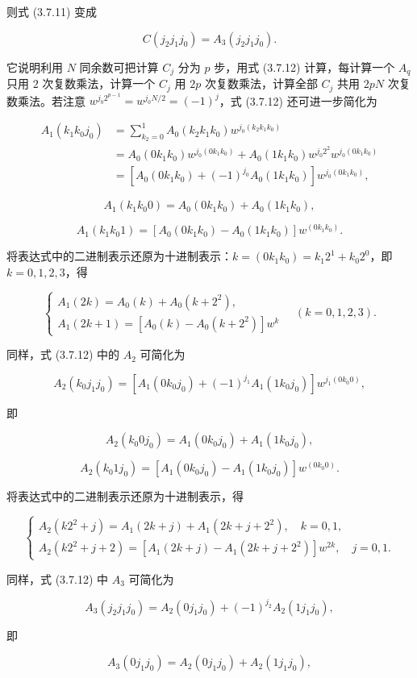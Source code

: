 \documentclass[
  10pt,
  fontset=fandol]{ctexart}
\begin{document}
则式 (3.7.11) 变成

\[
C(j_2j_1j_0)=A_3(j_2j_1j_0).
\]

它说明利用 \(N\) 同余数可把计算 \(C_j\) 分为 \(p\) 步，用式 (3.7.12) 计算，每计算一个 \(A_q\) 只用 \(2\) 次复数乘法，计算一个 \(C_j\) 用 \(2p\) 次复数乘法，计算全部 \(C_j\) 共用 \(2pN\) 次复数乘法。若注意 \(w^{j_0 2^{p-1}}=w^{j_0N/2}=(-1)^j\)，式 (3.7.12) 还可进一步简化为

\[
\begin{aligned}
A_1(k_1k_0j_0)&=\sum_{k_2=0}^1A_0(k_2k_1k_0)w^{j_0(k_2k_1k_0)}\\
&=A_0(0k_1k_0)w^{j_0(0k_1k_0)}+A_0(1k_1k_0)w^{j_0 2^2}w^{j_0(0k_1k_0)}\\
&=[A_0(0k_1k_0)+(-1)^{j_0}A_0(1k_1k_0)]w^{j_0(0k_1k_0)},
\end{aligned}
\]

\[
A_1(k_1k_0 0)=A_0(0k_1k_0)+A_0(1k_1k_0),
\]

\[
A_1(k_1k_0 1)=[A_0(0k_1k_0)-A_0(1k_1k_0)]w^{(0k_1k_0)}.
\]

将表达式中的二进制表示还原为十进制表示：\(k=(0k_1k_0)=k_1 2^1+k_0 2^0\)，即 \(k=0,1,2,3\)，得

\[
\begin{cases}
A_1(2k)=A_0(k)+A_0(k+2^2),\\
A_1(2k+1)=[A_0(k)-A_0(k+2^2)]w^k
\end{cases}\quad(k=0,1,2,3).\tag{3.7.13}
\]

同样，式 (3.7.12) 中的 \(A_2\) 可简化为

\[
A_2(k_0j_1j_0)=[A_1(0k_0j_0)+(-1)^{j_1}A_1(1k_0j_0)]w^{j_1(0k_0 0)},
\]

即

\[
A_2(k_0 0j_0)=A_1(0k_0j_0)+A_1(1k_0j_0),
\]

\[
A_2(k_0 1j_0)=[A_1(0k_0j_0)-A_1(1k_0j_0)]w^{(0k_0 0)}.
\]

将表达式中的二进制表示还原为十进制表示，得

\[
\begin{cases}
A_2(k2^2+j)=A_1(2k+j)+A_1(2k+j+2^2),\quad k=0,1,\\
A_2(k2^2+j+2)=[A_1(2k+j)-A_1(2k+j+2^2)]w^{2k},\quad j=0,1.
\end{cases}\tag{3.7.14}
\]

同样，式 (3.7.12) 中 \(A_3\) 可简化为

\[
A_3(j_2j_1j_0)=A_2(0j_1j_0)+(-1)^{j_2}A_2(1j_1j_0),
\]

即

\[
A_3(0j_1j_0)=A_2(0j_1j_0)+A_2(1j_1j_0),
\]
\end{document}
